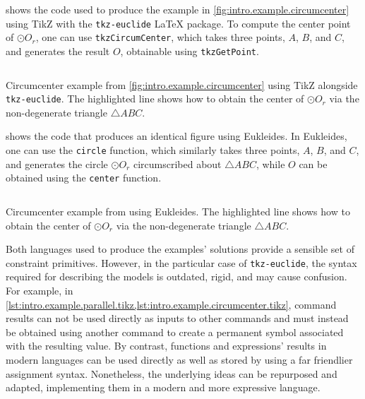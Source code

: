  shows the code used to produce the
example in \cref{fig:intro.example.circumcenter} using \ac{TikZ} with the
\texttt{tkz-euclide} \LaTeX{} package.  To compute the center point of $\odot
O_r$, one can use \texttt{tkzCircumCenter}, which takes three points, $A$, $B$,
and $C$, and generates the result $O$, obtainable using \texttt{tkzGetPoint}.

\begin{listing}[htb]
  \inputminted{latex}{tikz/ex-circumcenter.tikz}
  \caption[Circumcenter example using TikZ]{
    Circumcenter example from \cref{fig:intro.example.circumcenter} using
    \ac{TikZ} alongside \texttt{tkz-euclide}.  The highlighted line shows how to
    obtain the center of $\odot O_r$ via the non-degenerate triangle
    $\triangle ABC$.}%
  \label{lst:intro.example.circumcenter.tikz}
\end{listing}

 shows the code that produces an
identical figure using Eukleides.  In Eukleides, one can use the \texttt{circle}
function, which similarly takes three points, $A$, $B$, and $C$, and generates
the circle $\odot O_r$ circumscribed about $\triangle ABC$, while $O$ can be
obtained using the \texttt{center} function.

\begin{listing}[htb]
  \inputminted{text}{euk/ex-circumcenter.euk}
  \caption[Circumcenter example using Eukleides]{
    Circumcenter example from  using
    Eukleides.  The highlighted line shows how to obtain the center of $\odot
    O_r$ via the non-degenerate triangle $\triangle ABC$.}%
  \label{lst:intro.example.circumcenter.euk}
\end{listing}

Both languages used to produce the examples' solutions provide a sensible set of
constraint primitives.  However, in the particular case of \texttt{tkz-euclide},
the syntax required for describing the models is outdated, rigid, and may cause
confusion.  For example, in
\cref{lst:intro.example.parallel.tikz,lst:intro.example.circumcenter.tikz},
command results can not be used directly as inputs to other commands and must
instead be obtained using another command to create a permanent symbol
associated with the resulting value.  By contrast, functions and expressions'
results in modern languages can be used directly as well as stored by using a
far friendlier assignment syntax.  Nonetheless, the underlying ideas can be
repurposed and adapted, implementing them in a modern and more expressive
language.
